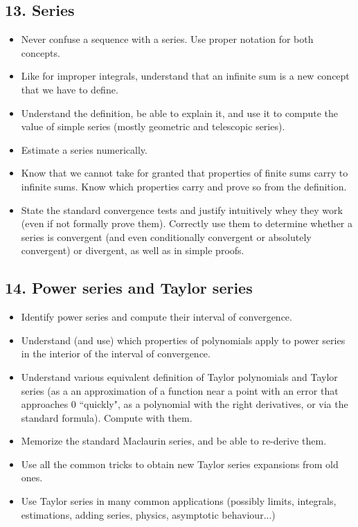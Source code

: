 \documentclass[11pt]{article}
\begin{document}
\subsection{13. Series} \label{unit13}

	\begin{itemize}
		\item Never confuse a sequence with a series.  Use proper notation for both concepts.
		\item Like for improper integrals, understand that an infinite sum is a new concept that we have to define.  
		\item Understand the definition, be able to explain it, and use it to compute the value of simple series (mostly geometric and telescopic series).  
		\item Estimate a series numerically.
		\item Know that we cannot take for granted that properties of finite sums carry to infinite sums.  Know which properties carry and prove so from the definition.
		\item  State the standard convergence tests and justify intuitively whey they work (even if not formally prove them).  Correctly use them to determine whether a series is convergent (and even conditionally convergent or absolutely convergent) or divergent, as well as in simple proofs.
	\end{itemize}
	
\subsection{14. Power series and Taylor series} \label{unit14}

	\begin{itemize}
		\item Identify power series and compute their interval of convergence.   %
		\item  Understand (and use) which properties of polynomials apply to power series in the interior of the interval of convergence.
		\item Understand various equivalent definition of Taylor polynomials and Taylor series (as a an approximation of a function near a point with an error that approaches 0 ``quickly", as a polynomial with the right derivatives, or via the standard formula).  Compute with them.
		\item  Memorize the standard Maclaurin series, and be able to re-derive them.
		\item  Use all the common tricks to obtain new Taylor series expansions from old ones.
		\item  Use Taylor series in many common applications (possibly limits, integrals, estimations, adding series, physics, asymptotic behaviour...)
	\end{itemize}
\end{document}
